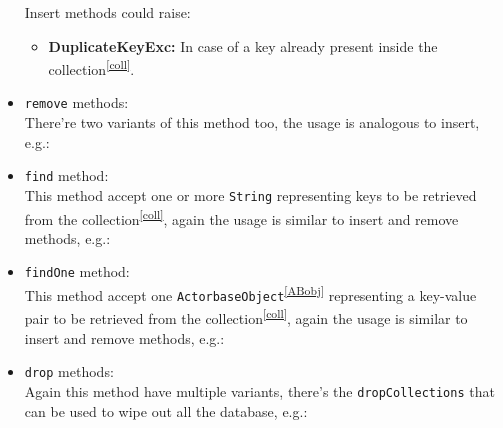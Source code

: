 \documentclass{scalatekids-article}
\begin{document}
\begin{itemize}
  Insert methods could raise:
  \begin{itemize}
  \item \textbf{DuplicateKeyExc:} In case of a key already present inside the collection\textsuperscript{\ref{coll}}.
  \end{itemize}
\item \verb=remove= methods:\\ There're two variants of this method too, the usage is
  analogous to insert, e.g.:
\item \verb=find= method:\\ This method accept one or more \verb=String= representing
  keys to be retrieved from the collection\textsuperscript{\ref{coll}}, again the usage is similar to insert and
  remove methods, e.g.:
\item \verb=findOne= method:\\ This method accept one \verb=ActorbaseObject=\textsuperscript{\ref{ABobj}} representing
  a key-value pair to be retrieved from the collection\textsuperscript{\ref{coll}}, again the usage is similar to insert and
  remove methods, e.g.:
\item \verb=drop= methods:\\ Again this method have multiple variants, there's the
  \verb=dropCollections= that can be used to wipe out all the database, e.g.:

\end{itemize}
\end{document}
